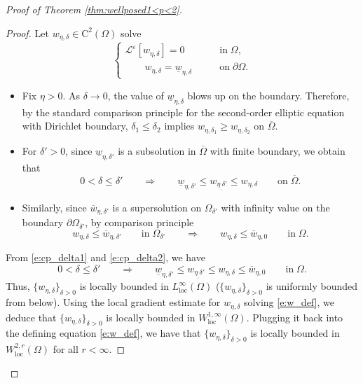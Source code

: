 \documentclass[11pt,reqno]{amsart}
\numberwithin{figure}{section}
\theoremstyle{plain}
\theoremstyle{remark}
\numberwithin{equation}{section}
\begin{document}
\begin{appendices}
\begin{proof} [Proof of Theorem \ref{thm:wellposed1<p<2}]
\begin{proof} Let $w_{\eta,\delta}\in \mathrm{C}^2(\Omega)$ solve
    \begin{equation}\label{e:w_def}
    \begin{cases}
        \mathcal{L}^\varepsilon\left[w_{\eta,\delta}\right] = 0 &\qquad\text{in}\;\Omega,\\
        \qquad w_{\eta,\delta} = \underline{w}_{\eta,\delta} &\qquad\text{on}\;\partial\Omega.
    \end{cases}
    \end{equation}
    \begin{itemize}
        \item Fix $\eta>0$. As $\delta\to 0$, the value of $\underline{w}_{\eta,\delta}$ blows up on the boundary. Therefore, by the standard comparison principle for the second-order elliptic equation with Dirichlet boundary, $\delta_1 \leq  \delta_2$ implies $w_{\eta,\delta_1}\geq  w_{\eta,\delta_2}$ on $\overline{\Omega}$. 
        \item For $\delta'>0$, since $\underline{w}_{\eta,\delta'}$ is a subsolution in $\overline{\Omega}$ with finite boundary, we obtain that
            \begin{equation}\label{e:cp_delta1}
                0<\delta \leq \delta'\qquad\Longrightarrow\qquad \underline{w}_{\eta,\delta'} \leq w_{\eta_,\delta'}\leq w_{\eta,\delta} \qquad\text{on}\;\overline{\Omega}.
            \end{equation}
        \item Similarly, since $\overline{w}_{\eta,\delta'}$ is a supersolution on $\Omega_{\delta'}$ with infinity value on the boundary $\partial\Omega_{\delta'}$, by comparison principle
            \begin{equation}\label{e:cp_delta2}
                w_{\eta,\delta} \leq \overline{w}_{\eta, \delta'} \qquad\text{in}\;\Omega_{\delta'} \qquad\Longrightarrow\qquad w_{\eta,\delta} \leq \overline{w}_{\eta,0} \qquad\text{in}\;\Omega.
            \end{equation}
    \end{itemize}
    \noindent From \eqref{e:cp_delta1} and \eqref{e:cp_delta2}, we have
    \begin{equation}\label{e:cp_delta3}
        0<\delta \leq \delta'\qquad\Longrightarrow\qquad \underline{w}_{\eta,\delta'} \leq w_{\eta_,\delta'}\leq w_{\eta,\delta} \leq \overline{w}_{\eta,0} \qquad\text{in}\;\Omega.
    \end{equation}
    Thus, $\{w_{\eta,\delta}\}_{\delta>0}$ is locally bounded in $L^{\infty}_{\mathrm{loc}}(\Omega)$ ($\{w_{\eta,\delta}\}_{\delta>0}$ is uniformly bounded from below). Using the local gradient estimate for $w_{\eta,\delta}$ solving \eqref{e:w_def}, we deduce that $\{w_{\eta,\delta}\}_{\delta>0}$ is locally bounded in $W^{1,\infty}_{\mathrm{loc}}(\Omega)$. Plugging it back into the defining equation \eqref{e:w_def}, we have that $\{w_{\eta,\delta}\}_{\delta>0}$ is locally bounded in $W^{2,r}_{\mathrm{loc}}(\Omega)$ for all $r<\infty$.
    

\end{proof}
\end{proof}
\end{appendices}
\end{document}
